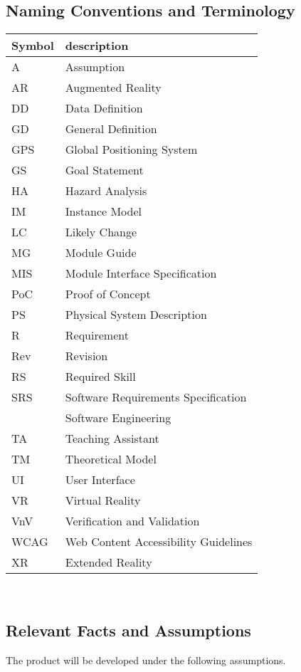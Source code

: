\documentclass[12pt]{article}
\begin{document}
\subsection{Naming Conventions and Terminology}
\label{Naming_Convention_Table}
\renewcommand{\arraystretch}{1.2}
\begin{tabular}{l l} 
  \toprule		
  \textbf{Symbol} & \textbf{description}\\
  \midrule 
  A & Assumption\\
  AR & Augmented Reality\\
  DD & Data Definition\\
  GD & General Definition\\
  GPS & Global Positioning System\\
  GS & Goal Statement\\
  HA & Hazard Analysis\\
  IM & Instance Model\\
  LC & Likely Change\\
  MG & Module Guide\\
  MIS & Module Interface Specification\\
  PoC & Proof of Concept \\ 
  PS & Physical System Description\\
  R & Requirement\\
  Rev & Revision\\
  RS & Required Skill\\
  SRS & Software Requirements Specification\\
  \progname{} & Software Engineering\\
  TA & Teaching Assistant\\
  TM & Theoretical Model\\
  UI & User Interface\\
  VR & Virtual Reality\\
  VnV & Verification and Validation \\
  WCAG & Web Content Accessibility Guidelines \\
  XR & Extended Reality\\
  \bottomrule
\end{tabular}\\

\subsection{Relevant Facts and Assumptions}
The product will be developed under the following assumptions.
\end{document}
